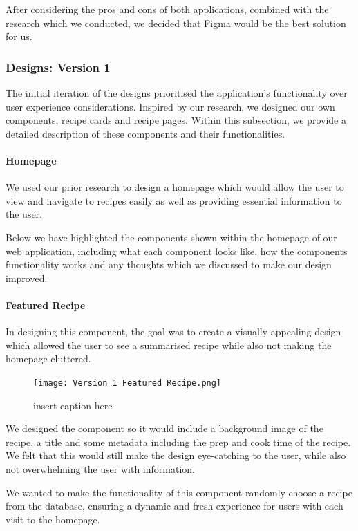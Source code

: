\documentclass{article}
\begin{document}
After considering the pros and cons of both applications, combined with the research which we conducted, we decided that Figma would be the best solution for us.

\subsubsection{Designs: Version 1}
The initial iteration of the designs prioritised the application's functionality over user experience considerations. Inspired by our research, we designed our own components, recipe cards and recipe pages. Within this subsection, we provide a detailed description of these components and their functionalities.

\paragraph{Homepage}
We used our prior research to design a homepage which would allow the user to view and navigate to recipes easily as well as providing essential information to the user. 

Below we have highlighted the components shown within the homepage of our web application, including what each component looks like, how the components functionality works and any thoughts which we discussed to make our design improved.

\paragraph{Featured Recipe}
In designing this component, the goal was to create a visually appealing design which allowed the user to see a summarised recipe while also not making the homepage cluttered.

\begin{figure}[htbp]
  \texttt{[image: Version 1 Featured Recipe.png]}
  \centering
  \caption{insert caption here}
\end{figure}

We designed the component so it would include a background image of the recipe, a title and some metadata including the prep and cook time of the recipe. We felt that this would still make the design eye-catching to the user, while also not overwhelming the user with information.

We wanted to make the functionality of this component randomly choose a recipe from the database, ensuring a dynamic and fresh experience for users with each visit to the homepage.
\end{document}
